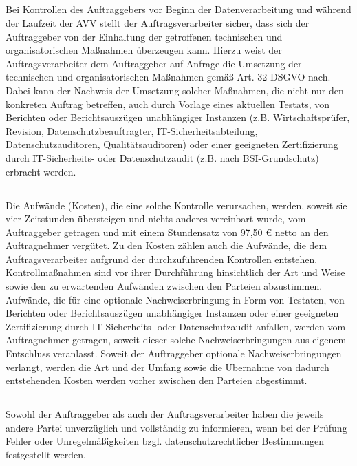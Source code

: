 \documentclass[10pt]{article}
\begin{document}
\subsection{} Bei Kontrollen des Auftraggebers vor Beginn der Datenverarbeitung und während
der Laufzeit der AVV stellt der Auftragsverarbeiter sicher, dass sich der
Auftraggeber von der Einhaltung der getroffenen technischen und
organisatorischen Maßnahmen überzeugen kann. Hierzu weist der
Auftragsverarbeiter dem Auftraggeber auf Anfrage die Umsetzung der technischen
und organisatorischen Maßnahmen gemäß Art. 32 DSGVO nach. Dabei kann der
Nachweis der Umsetzung solcher Maßnahmen, die nicht nur den konkreten Auftrag
betreffen, auch durch Vorlage eines aktuellen Testats, von Berichten oder
Berichtsauszügen unabhängiger Instanzen (z.B. Wirtschaftsprüfer, Revision,
Datenschutzbeauftragter, IT-Sicherheitsabteilung, Datenschutzauditoren,
Qualitätsauditoren) oder einer geeigneten Zertifizierung durch IT-Sicherheits- oder
Datenschutzaudit (z.B. nach BSI-Grundschutz) erbracht werden.
\subsection{} Die Aufwände (Kosten), die eine solche Kontrolle verursachen, werden, soweit sie
vier Zeitstunden übersteigen und nichts anderes vereinbart wurde,
vom Auftraggeber getragen und mit einem Stundensatz von 97,50 € netto an den
Auftragnehmer vergütet. Zu den Kosten zählen auch die Aufwände, die dem
Auftragsverarbeiter aufgrund der durchzuführenden Kontrollen
entstehen. Kontrollmaßnahmen sind vor ihrer Durchführung hinsichtlich der Art
und Weise sowie den zu erwartenden Aufwänden zwischen den Parteien
abzustimmen. Aufwände, die für eine optionale Nachweiserbringung in Form von
Testaten, von Berichten oder Berichtsauszügen unabhängiger Instanzen oder einer
geeigneten Zertifizierung durch IT-Sicherheits- oder Datenschutzaudit anfallen,
werden vom Auftragnehmer getragen, soweit dieser solche Nachweiserbringungen
aus eigenem Entschluss veranlasst. Soweit der Auftraggeber optionale
Nachweiserbringungen verlangt, werden die Art und der Umfang sowie
die Übernahme von dadurch entstehenden Kosten werden vorher zwischen den
Parteien abgestimmt.
\subsection{} Sowohl der Auftraggeber als auch der Auftragsverarbeiter haben die jeweils andere
Partei unverzüglich und vollständig zu informieren, wenn bei der Prüfung Fehler
oder Unregelmäßigkeiten bzgl. datenschutzrechtlicher Bestimmungen festgestellt
werden.
\end{document}
